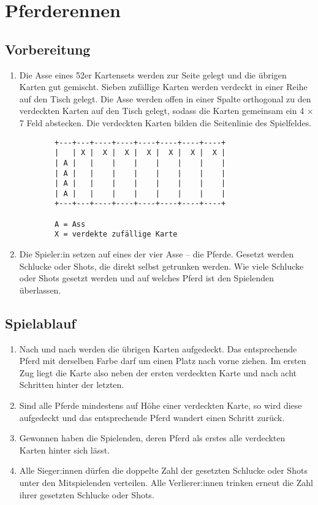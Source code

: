 \chapter{Pferderennen}
\section{Vorbereitung}
\begin{enumerate}[label={(\arabic*)}]    
    \item
    Die Asse eines 52er Kartensets werden zur Seite gelegt und die übrigen Karten gut gemischt.
    Sieben zufällige Karten werden verdeckt in einer Reihe auf den Tisch gelegt.
    Die Asse werden offen in einer Spalte orthogonal zu den verdeckten Karten auf den Tisch gelegt, sodass die Karten gemeinsam ein 4 \begin{math}\times\end{math} 7 Feld abstecken.
    Die verdeckten Karten bilden die Seitenlinie des Spielfeldes.
    \begin{verbatim}
        +---+---+----+----+----+----+----+----+
        |   | X |  X |  X |  X |  X |  X |  X |
        | A |   |    |    |    |    |    |    |
        | A |   |    |    |    |    |    |    |
        | A |   |    |    |    |    |    |    |
        | A |   |    |    |    |    |    |    |
        +---+---+----+----+----+----+----+----+
        
        A = Ass
        X = verdekte zufällige Karte
    \end{verbatim}

    \item
    Die Spieler:in setzen auf eines der vier Asse – die \glqq{}Pferde\grqq{}.
    Gesetzt werden Schlucke oder Shots, die direkt selbst getrunken werden.
    Wie viele Schlucke oder Shots gesetzt werden und auf welches Pferd ist den Spielenden überlassen.
\end{enumerate}

\section{Spielablauf}
\begin{enumerate}[label={(\arabic*)}]
    \item
    Nach und nach werden die übrigen Karten aufgedeckt.
    Das entsprechende Pferd mit derselben Farbe darf um einen Platz nach vorne ziehen.
    Im ersten Zug liegt die Karte also neben der ersten verdeckten Karte und nach acht Schritten hinter der letzten.

    \item
    Sind alle Pferde mindestens auf Höhe einer verdeckten Karte, so wird diese aufgedeckt und das entsprechende Pferd wandert einen Schritt zurück.

    \item
    Gewonnen haben die Spielenden, deren Pferd als erstes alle verdeckten Karten hinter sich lässt.

    \item
    Alle Sieger:innen dürfen die doppelte Zahl der gesetzten Schlucke oder Shots unter den Mitspielenden verteilen.
    Alle Verlierer:innen trinken erneut die Zahl ihrer gesetzten Schlucke oder Shots.
\end{enumerate}
